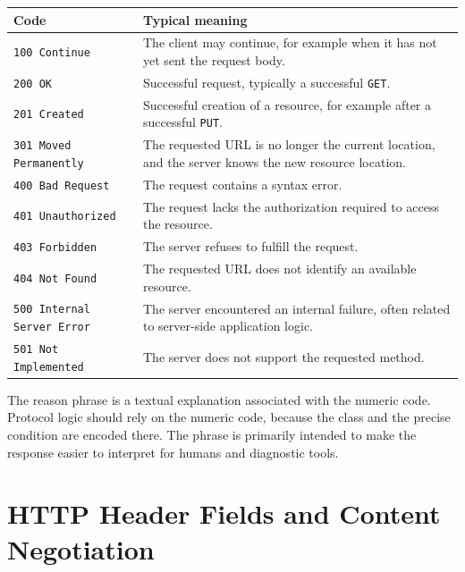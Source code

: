 \documentclass{scrbook}
\begin{document}
\begin{table}[!h]
	\begin{tabularx}{\linewidth}{p{}X}
	\textbf{Code} & \textbf{Typical meaning} \\
	\hline
	
	\texttt{100 Continue} & The client may continue, for example when it has not yet sent the request body. \\ \hline
	
	\texttt{200 OK} & Successful request, typically a successful \texttt{GET}. \\ \hline
	
	\texttt{201 Created} & Successful creation of a resource, for example after a successful \texttt{PUT}. \\ \hline
	
	\texttt{301 Moved Permanently} & The requested URL is no longer the current location, and the server knows the new resource location. \\ \hline
	
	\texttt{400 Bad Request} & The request contains a syntax error. \\ \hline
	
	\texttt{401 Unauthorized} & The request lacks the authorization required to access the resource. \\ \hline
	
	\texttt{403 Forbidden} & The server refuses to fulfill the request. \\ \hline
	
	\texttt{404 Not Found} & The requested URL does not identify an available resource. \\ \hline
	
	\texttt{500 Internal Server Error} & The server encountered an internal failure, often related to server-side application logic. \\ \hline
	
	\texttt{501 Not Implemented} & The server does not support the requested method. \\ \hline
	\end{tabularx}
\end{table}

The reason phrase is a textual explanation associated with the numeric code. Protocol logic should rely on the numeric code, because the class and the precise condition are encoded there. The phrase is primarily intended to make the response easier to interpret for humans and diagnostic tools.

\chapter{HTTP Header Fields and Content Negotiation}
\end{document}
